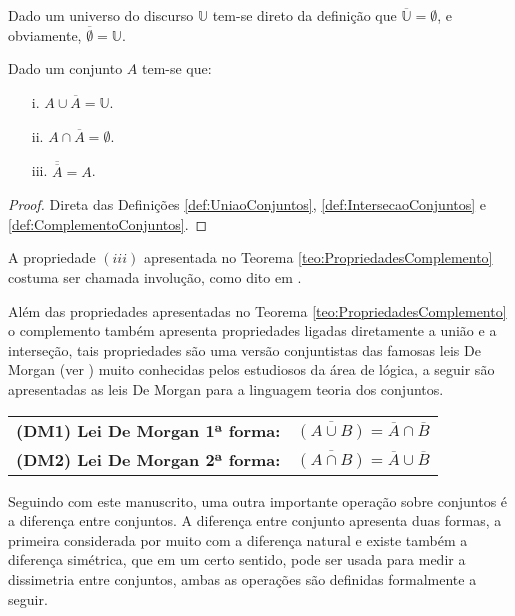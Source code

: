 \begin{example}
	Dado um universo do discurso $\mathbb{U}$ tem-se direto da definição que $\overline{\mathbb{U}} = \emptyset$, e obviamente, $\overline{\emptyset} = \mathbb{U}$.
\end{example}

\begin{theorem}\label{teo:PropriedadesComplemento}
	Dado um conjunto $A$ tem-se que:
	\begin{itemize}
		\item[i.] $A \cup \overline{A} = \mathbb{U}$.
		\item[ii.] $A \cap \overline{A} = \emptyset$.
		\item[iii.] $\overline{\overline{A}} = A$.
	\end{itemize}
\end{theorem}

\begin{proof}
	Direta das Definições \ref{def:UniaoConjuntos}, \ref{def:IntersecaoConjuntos} e \ref{def:ComplementoConjuntos}.
\end{proof}

\begin{remark}
	A propriedade $(iii)$ apresentada no Teorema \ref{teo:PropriedadesComplemento} costuma ser chamada involução, como dito em \cite{lipschutz1978-TC}.
\end{remark}

Além das propriedades apresentadas no Teorema \ref{teo:PropriedadesComplemento} o complemento também apresenta propriedades ligadas diretamente a união e a interseção, tais propriedades são uma versão conjuntistas das famosas leis De Morgan (ver \cite{carmo2013, joaoPavao2014, lipschutz2013-MD}) muito conhecidas pelos estudiosos da área de lógica, a seguir são apresentadas as leis De Morgan para a linguagem teoria dos conjuntos.

\begin{table*}[h]
	\centering
	\begin{tabular}{lc}
		\textbf{(DM1) Lei De Morgan 1ª forma:} & $\overline{(A \cup B)} = \overline{A} \cap \overline{B}$\\
		\textbf{(DM2) Lei De Morgan 2ª forma:} & $\overline{(A \cap B)} = \overline{A} \cup \overline{B}$\\
	\end{tabular}
\end{table*}

Seguindo com este manuscrito, uma outra importante operação sobre conjuntos é a diferença entre conjuntos. A diferença entre conjunto apresenta duas formas, a primeira considerada por muito com a diferença natural \cite{carmo2013} e existe também a diferença simétrica, que em um certo sentido, pode ser usada para medir a  dissimetria entre conjuntos, ambas as operações são definidas formalmente a seguir.

